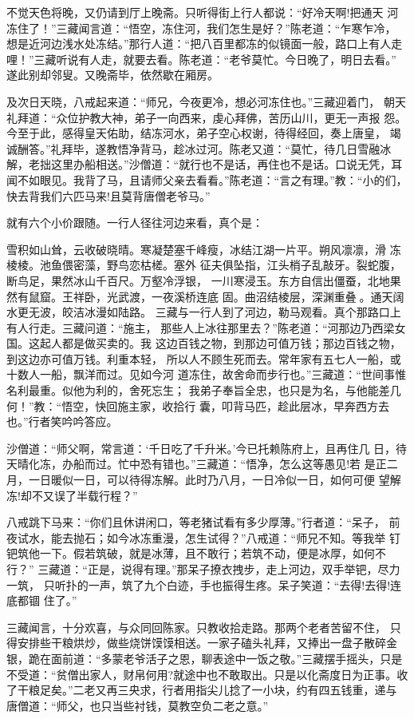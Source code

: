 不觉天色将晚，又仍请到厅上晚斋。只听得街上行人都说：“好冷天啊!把通天
河冻住了！”三藏闻言道：“悟空，冻住河，我们怎生是好？”陈老道：“乍寒乍冷，
想是近河边浅水处冻结。”那行人道：“把八百里都冻的似镜面一般，路口上有人走
哩！”三藏听说有人走，就要去看。陈老道：“老爷莫忙。今日晚了，明日去看。”
遂此别却邻叟。又晚斋毕，依然歇在厢房。

及次日天晓，八戒起来道：“师兄，今夜更冷，想必河冻住也。”三藏迎着门，
朝天礼拜道：“众位护教大神，弟子一向西来，虔心拜佛，苦历山川，更无一声报
怨。今至于此，感得皇天佑助，结冻河水，弟子空心权谢，待得经回，奏上唐皇，
竭诚酬答。”礼拜毕，遂教悟净背马，趁冰过河。陈老又道：“莫忙，待几日雪融冰
解，老拙这里办船相送。”沙僧道：“就行也不是话，再住也不是话。口说无凭，耳
闻不如眼见。我背了马，且请师父亲去看看。”陈老道：“言之有理。”教：“小的们，
快去背我们六匹马来!且莫背唐僧老爷马。”

就有六个小价跟随。一行人径往河边来看，真个是：

雪积如山耸，云收破晓晴。寒凝楚塞千峰瘦，冰结江湖一片平。朔风凛凛，滑
冻棱棱。池鱼偎密藻，野鸟恋枯槎。塞外
征夫俱坠指，江头梢子乱敲牙。裂蛇腹，断鸟足，果然冰山千百尺。万壑冷浮银，
一川寒浸玉。东方自信出僵蚕，北地果然有鼠窟。王祥卧，光武渡，一夜溪桥连底
固。曲沼结棱层，深渊重叠。通天阔水更无波，皎洁冰漫如陆路。
三藏与一行人到了河边，勒马观看。真个那路口上有人行走。三藏问道：“施主，
那些人上冰往那里去？”陈老道：“河那边乃西梁女国。这起人都是做买卖的。我
这边百钱之物，到那边可值万钱；那边百钱之物，到这边亦可值万钱。利重本轻，
所以人不顾生死而去。常年家有五七人一船，或十数人一船，飘洋而过。见如今河
道冻住，故舍命而步行也。”三藏道：“世间事惟名利最重。似他为利的，舍死忘生；
我弟子奉旨全忠，也只是为名，与他能差几何！”教：“悟空，快回施主家，收拾行
囊，叩背马匹，趁此层冰，早奔西方去也。”行者笑吟吟答应。

沙僧道：“师父啊，常言道：‘千日吃了千升米。’今已托赖陈府上，且再住几
日，待天晴化冻，办船而过。忙中恐有错也。”三藏道：“悟净，怎么这等愚见!若
是正二月，一日暖似一日，可以待得冻解。此时乃八月，一日冷似一日，如何可便
望解冻!却不又误了半载行程？”

八戒跳下马来：“你们且休讲闲口，等老猪试看有多少厚薄。”行者道：“呆子，
前夜试水，能去抛石；如今冰冻重漫，怎生试得？”八戒道：“师兄不知。等我举
钉钯筑他一下。假若筑破，就是冰薄，且不敢行；若筑不动，便是冰厚，如何不行？”
三藏道：“正是，说得有理。”那呆子撩衣拽步，走上河边，双手举钯，尽力一筑，
只听扑的一声，筑了九个白迹，手也振得生疼。呆子笑道：“去得!去得!连底都锢
住了。”

三藏闻言，十分欢喜，与众同回陈家。只教收拾走路。那两个老者苦留不住，
只得安排些干粮烘炒，做些烧饼馍馍相送。一家子磕头礼拜，又捧出一盘子散碎金
银，跪在面前道：“多蒙老爷活子之恩，聊表途中一饭之敬。”三藏摆手摇头，只是
不受道：“贫僧出家人，财帛何用?就途中也不敢取出。只是以化斋度日为正事。收
了干粮足矣。”二老又再三央求，行者用指尖儿捻了一小块，约有四五钱重，递与
唐僧道：“师父，也只当些衬钱，莫教空负二老之意。”

